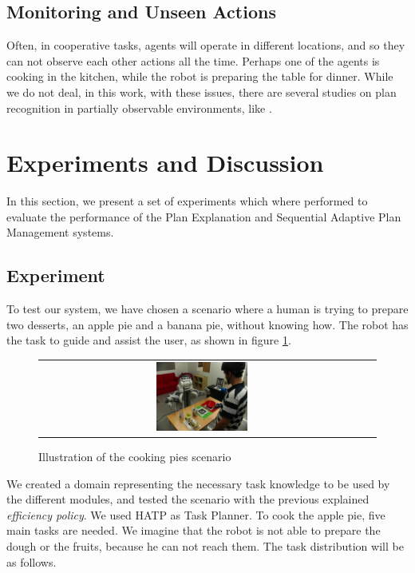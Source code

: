 \subsection{Monitoring and Unseen Actions}
Often, in cooperative tasks, agents will operate in different locations, and so they can not observe each other actions all the time. Perhaps one of the agents is cooking in the kitchen,  while the robot is preparing the table for dinner. While we do not deal, in this work, with these issues, there are several studies on plan recognition in partially observable environments, like \cite{geib2005partial}.

\section{Experiments and Discussion}
\label{sec:plan_management-experiments}
In this section, we present a set of experiments which where performed to evaluate the performance of the Plan Explanation and Sequential Adaptive Plan Management systems.

 \subsection{Experiment}
 \label{sec:plan_management-experiment}
To test our system, we have chosen a scenario where a human is trying to prepare two desserts, an apple pie and a banana pie, without knowing how. The robot has the task to guide and assist the user, as shown in figure \ref{fig:plan_management-scenario}. 

\begin{figure}[ht!]

 \centering
 \begin{tabular}{cc}
  \includegraphics[width=0.29\textwidth]{img/plan_management/scenario.JPG}
 \end{tabular}
 \caption{Illustration of the cooking pies scenario}
 \label{fig:plan_management-scenario}
 \end{figure}

We created a domain representing the necessary task knowledge to be used by the different modules, and tested the scenario with the previous explained \textit{efficiency policy}. We used HATP as Task Planner.
To cook the apple pie, five main tasks are needed. We imagine that the robot is not able to prepare the dough or the fruits, because he can not reach them. The task distribution will be as follows.

